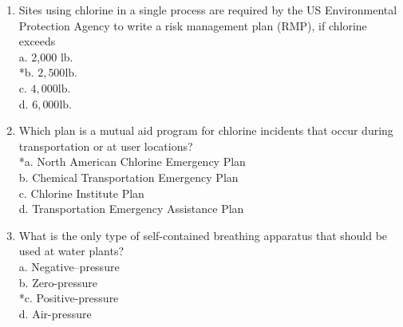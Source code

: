 \begin{enumerate}[1.]
  \item Sites using chlorine in a single process are required by the US Environmental Protection Agency to write a risk management plan (RMP), if chlorine exceeds\\
a. 2,000 lb.\\
*b. $2,500 \mathrm{lb}$.\\
c. $4,000 \mathrm{lb}$.\\
d. $6,000 \mathrm{lb}$.\\


  \item Which plan is a mutual aid program for chlorine incidents that occur during transportation or at user locations?\\
*a. North American Chlorine Emergency Plan\\
b. Chemical Transportation Emergency Plan\\
c. Chlorine Institute Plan\\
d. Transportation Emergency Assistance Plan\\

\item What is the only type of self-contained breathing apparatus that should be used at water plants?\\
a.	Negative--pressure\\
b.	Zero-pressure\\
*c.	Positive-pressure\\
d.	Air-pressure\\

\end{enumerate}



